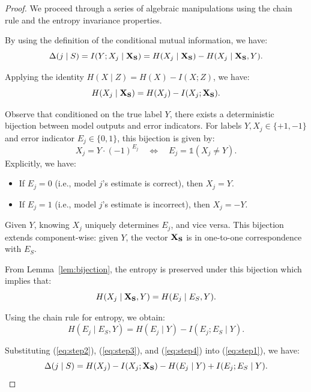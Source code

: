 \documentclass{article}
\theoremstyle{plain}
\theoremstyle{definition}
\theoremstyle{remark}
\begin{document}
\begin{proof}
We proceed through a series of algebraic manipulations using the chain rule and the entropy invariance properties.


By using the definition of the conditional mutual information, we have:
\begin{equation}
\label{eq:step1}
    \Delta(j \mid S) = I(Y; X_j \mid {\bf X_S}) = H(X_j \mid {\bf X_S}) - H(X_j \mid {\bf X_S}, Y).
\end{equation}


Applying the identity $H(X \mid Z) = H(X) - I(X; Z)$, we have:
\begin{equation}
\label{eq:step2}
    H(X_j \mid {\bf X_S}) = H(X_j) - I(X_j; {\bf X_S}).
\end{equation}


Observe that conditioned on the true label $Y$, there exists a deterministic bijection between model outputs and error indicators. For labels $Y, X_j \in \{+1, -1\}$ and error indicator $E_j \in \{0, 1\}$, this bijection is given by:
\begin{equation}
    X_j = Y \cdot (-1)^{E_j} \quad \Longleftrightarrow \quad E_j = \mathds{1}(X_j \neq Y).
\end{equation}
Explicitly, we have:
\begin{itemize}
    \item If $E_j = 0$ (i.e.,  model $j$'s estimate is correct), then $X_j = Y$.
    \item If $E_j = 1$ (i.e., model $j$'s estimate is incorrect), then $X_j = -Y$.
\end{itemize}
Given $Y$, knowing $X_j$ uniquely determines $E_j$, and vice versa. This bijection extends component-wise: given $Y$, the vector ${\bf X_S}$ is in one-to-one correspondence with $E_S$.

From Lemma~\ref{lem:bijection}, the entropy is preserved under this bijection which implies that:
\begin{equation}
\label{eq:step3}
    H(X_j \mid {\bf X_S}, Y) = H(E_j \mid E_S, Y).
\end{equation}

Using the chain rule for entropy, we obtain:
\begin{equation}
\label{eq:step4}
    H(E_j \mid E_S, Y) = H(E_j \mid Y) - I(E_j; E_S \mid Y).
\end{equation}


Substituting (\ref{eq:step2}), (\ref{eq:step3}), and (\ref{eq:step4}) into (\ref{eq:step1}), we have:
\begin{equation}
\label{eq:step5}
    \Delta(j \mid S) = H(X_j) - I(X_j; {\bf X_S}) - H(E_j \mid Y) + I(E_j; E_S \mid Y).
\end{equation}



\end{proof}
\end{document}
